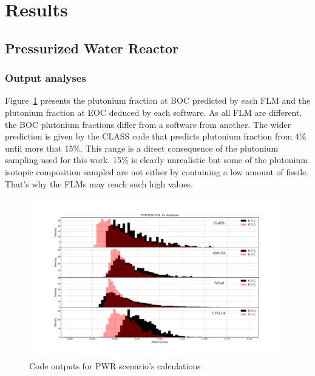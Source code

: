 
\section{Results}


\subsection{Pressurized Water Reactor}

\subsubsection{Output analyses}
Figure~\ref{fig:PWR_MOX_FLM_Pu} presents the plutonium fraction at BOC predicted by each FLM and the plutonium fraction at EOC deduced by each software. As all FLM are different, the BOC plutonium fractions differ from a software from another. The wider prediction is given by the CLASS code that predicts plutonium fraction from 4\% until more that 15\%. This range is a direct consequence of the plutonium sampling used for this work. 15\% is clearly unrealistic but some of the plutonium isotopic composition sampled are not either by containing a low amount of fissile. That's why the FLMs may reach such high values.    

\begin{figure}[h]
	\begin{center}
		\includegraphics[width = 0.99\textwidth]{../../Feature_1/RAW_DATA/FIG/PWR_MOX_FLM_Pu.pdf}
		\caption{Code outputs for PWR scenario's calculations}
		\label{fig:PWR_MOX_FLM_Pu}
	\end{center}
\end{figure}

